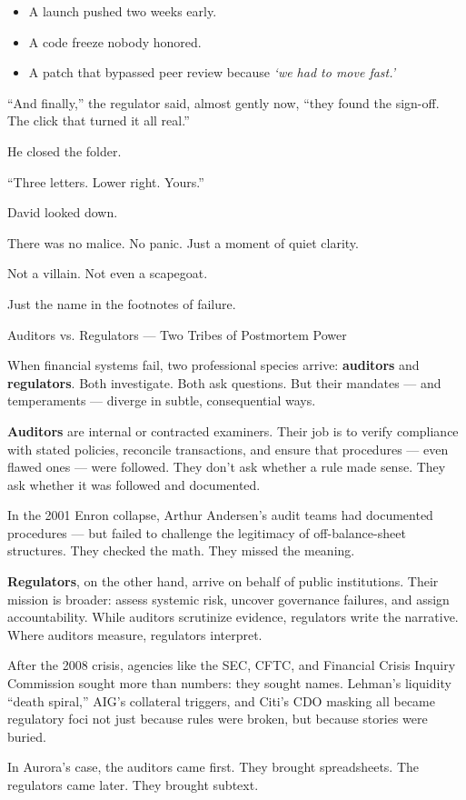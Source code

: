 \begin{itemize}
\item A launch pushed two weeks early.
\item A code freeze nobody honored.
\item A patch that bypassed peer review because \textit{‘we had to move fast.’}
\end{itemize}

“And finally,” the regulator said, almost gently now, “they found the sign-off. The click that turned it all real.”

He closed the folder.

“Three letters. Lower right. Yours.”

David looked down.

There was no malice. No panic. Just a moment of quiet clarity.

Not a villain. Not even a scapegoat.

Just the name in the footnotes of failure.

\medskip

\begin{HistoricalSidebar}{Auditors vs. Regulators — Two Tribes of Postmortem Power}

  When financial systems fail, two professional species arrive: \textbf{auditors} and \textbf{regulators}. 
  Both investigate. Both ask questions. But their mandates — and temperaments — diverge in subtle, consequential ways.

  \medskip
  
  \textbf{Auditors} are internal or contracted examiners. Their job is to verify compliance with stated policies, 
  reconcile transactions, and ensure that procedures — even flawed ones — were followed. They don’t ask whether a 
  rule made sense. They ask whether it was followed and documented.

  \medskip
  
  In the 2001 Enron collapse, Arthur Andersen’s audit teams had documented procedures — but failed to challenge 
  the legitimacy of off-balance-sheet structures. They checked the math. They missed the meaning.

  \medskip
  
  \textbf{Regulators}, on the other hand, arrive on behalf of public institutions. Their mission is broader: 
  assess systemic risk, uncover governance failures, and assign accountability. While auditors scrutinize evidence, 
  regulators write the narrative. Where auditors measure, regulators interpret.

  \medskip
  
  After the 2008 crisis, agencies like the SEC, CFTC, and Financial Crisis Inquiry Commission sought more than numbers: 
  they sought names. Lehman’s liquidity “death spiral,” AIG’s collateral triggers, and Citi’s CDO masking all became 
  regulatory foci not just because rules were broken, but because stories were buried.

  \medskip
  
  In Aurora’s case, the auditors came first. They brought spreadsheets.  
  The regulators came later. They brought subtext.
  
\end{HistoricalSidebar}

